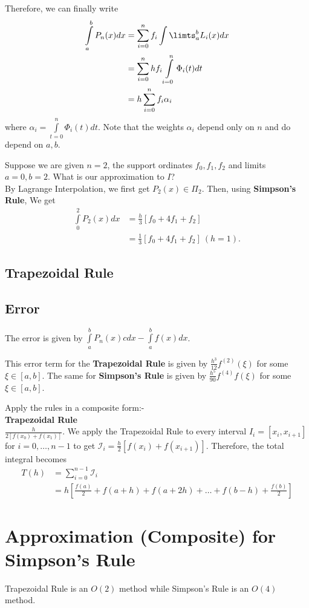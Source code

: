 Therefore, we can finally write 
\begin{align*}
    \int \limits _a ^b P_n(x) dx &= \sum \limits _{i=0} ^n f_i \int \limts _a^b L_i(x) dx \\
                                 &= \sum \limits  _{i=0} ^n h f_i \int \limits _{i=0}^n \Phi _i(t) dt \\
                                 &= h \sum \limits _{i=0}^n f_i \alpha_i
\end{align*}
where $\alpha _i = \int \limits _{t=0} ^n \Phi _i (t) dt$. Note that the weights $\alpha _i$ 
depend only on  $n$ and do depend on  $a,b$. 

\begin{example}
    Suppose we are given $n=2$, the support ordinates $f_0,f_1,f_2$ and limits $a=0, b=2$. 
    What is our approximation to  $I$?
    \\
    By Lagrange Interpolation, we first get $P_2(x) \in \Pi _2$. Then, using \textbf{Simpson's Rule}, We get
    \begin{align*}
        \int \limits _0^2 P_2(x) dx &= \frac{h}{3} [f_0 + 4f_1 +f_2]\\
                                    &= \frac{1}{3}[f_0 + 4f_1 +f_2] \  (h=1)
    .\end{align*}
\end{example}


\subsection{Trapezoidal Rule}

\subsection{Error}

The error is given by $\int \limits _a^b P_n(x)cdx - \int \limits _a^b f(x) dx$.

This error term for the \textbf{Trapezoidal Rule} is given by  $\frac{h^{3}}{12}f^{(2)}( \xi )$ 
for some $\xi \in [a,b]$. The same for \textbf{Simpson's Rule} is given by  
$\frac{h^5}{90}f^{(4)}f(\xi)$ for some $\xi \in [a,b]$.

Apply the rules in a composite form:- \\
\textbf{Trapezoidal Rule}\\
$\frac{h}{2[f(x_0) + f(x_1)]}$. We apply the Trapezoidal Rule to every interval 
$I_i = [x_i, x_{i+1}]$ for $i = 0, \ldots ,n-1$ to get $\mathscr{I} _i = \frac{h}{2} [f(x_i)
 + f(x_{i+1})]$. Therefore, the total integral becomes 
 \begin{align*}
     T(h) &= \sum \limits _{i=0} ^{n-1} \mathscr{I} _i \\
          &= h[\frac{f(a)}{2} + f(a+h) + f(a+2h) + \ldots + f(b-h) + \frac{f(b)}{2}]
 \end{align*}
 
 \section{Approximation (Composite) for Simpson's Rule}

 Trapezoidal Rule is an $O(2)$ method while Simpson's Rule is an $O(4)$ method.

